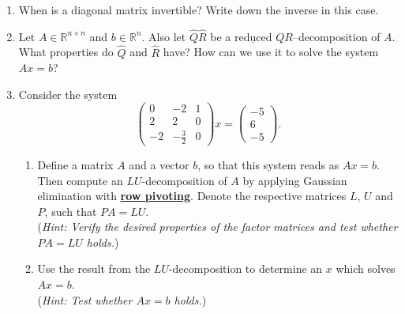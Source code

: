 \begin{enumerate}
	\item When is a diagonal matrix invertible? Write down the inverse in this case.
	\item Let $A\in\mathbb{R}^{n \times n}$ and $b \in \mathbb{R}^n$. Also let $\widehat{Q}\widehat{R}$ be a $\underline{\text{reduced}}$ $QR$--decomposition of $A$. What properties do $\widehat{Q}$ and $\widehat{R}$ have? How can we use it to solve the system $Ax = b$?
	\item Consider the system
	$$
	\begin{pmatrix}
	0	&-2				& 1\\
	2	&2				& 0\\
	-2	&-\frac{3}{2}	&0
	\end{pmatrix} x = 
	\begin{pmatrix}
	-5\\
	6\\
	-5
	\end{pmatrix}.
	$$
	\begin{enumerate}
		\item  Define a matrix $A$ and a vector $b$, so that this system reads as $Ax = b$. Then compute an $LU$-decomposition of $A$ by applying Gaussian elimination with \underline{\textbf{row pivoting}}. Denote the respective matrices $L$, $U$ and $P$, such that $PA = LU$.\\
		(\textit{Hint: Verify the desired properties of the factor matrices and test whether  $PA = LU$ holds.})
		\item Use the result from the $LU$-decomposition to determine an $x$ which solves $Ax=b$.\\
		(\textit{Hint: Test whether $Ax=b$ holds.})
	\end{enumerate}
\end{enumerate}